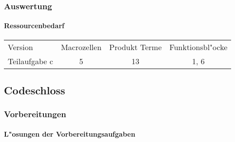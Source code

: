 \documentclass [] {scrartcl}
\begin{document}
  \subsubsection{Auswertung}
  \paragraph{Ressourcenbedarf}
  \begin{table}
    \begin{tabular}{lccc}
      Version & Macrozellen & Produkt Terme & Funktionsbl"ocke\\
      Teilaufgabe c & 5 & 13 & 1, 6\\
    \end{tabular}
  \end{table}

  \subsection{Codeschloss}
  \subsubsection{Vorbereitungen}
  \paragraph{L"osungen der Vorbereitungsaufgaben}
\end{document}
